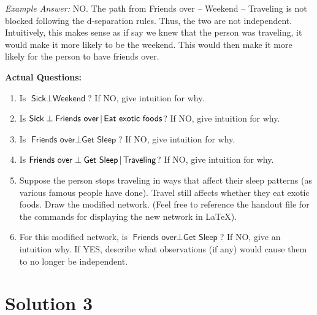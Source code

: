 \documentclass[submit]{harvardml}
\newcommand{\attr}[1]{\textsf{#1}}
\begin{document}
\begin{problem}
\textit{Example Answer:} NO. The path from Friends over -- Weekend -- Traveling is not blocked following the d-separation rules. Thus, the two are not independent. Intuitively, this makes sense as if say we knew that the person was traveling, it would make it more likely to be the weekend. This would then make it more likely for the person to have friends over.

\textbf{Actual Questions:}

\begin{enumerate}
\item Is $\attr{Sick} \perp \attr{Weekend}$?
  If NO, give intuition for why.


\item Is $\attr{Sick} \perp \attr{Friends over}\given \attr{Eat exotic
  foods}$? If NO, give intuition for why.


\item Is $\attr{Friends over} \perp \attr{Get Sleep}$? If NO, give
  intuition for why.

\item Is $\attr{Friends over} \perp \attr{Get Sleep} \given
  \attr{Traveling}$? If NO, give intuition for why.

\item Suppose the person stops traveling in ways that affect their
  sleep patterns (as various famous people have done).  Travel still
  affects whether they eat exotic foods.  Draw the modified network. (Feel free to reference the handout file for the commands for displaying the new network in \LaTeX).

\item For this modified network, is $\attr{Friends over} \perp
  \attr{Get Sleep}$? If NO, give an intuition why.  If YES,
  describe what observations (if any) would cause them to no longer be
  independent.

\end{enumerate}
\end{problem}


\section*{Solution 3}
\end{document}
